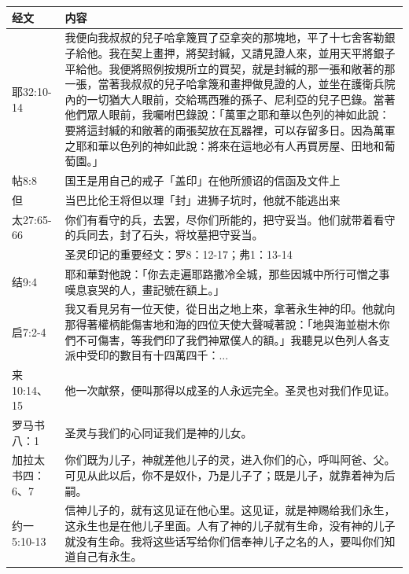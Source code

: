 \begin{table}[H]
\centering
\begin{tabular}{p{6em}|p{40em}}  \toprule
经文&内容\\  \midrule
耶32:10-14&我便向我叔叔的兒子哈拿篾買了亞拿突的那塊地，平了十七舍客勒銀子給他。我在契上畫押，將契封緘，又請見證人來，並用天平將銀子平給他。我便將照例按規所立的買契，就是封緘的那一張和敞著的那一張，當著我叔叔的兒子哈拿篾和畫押做見證的人，並坐在護衛兵院內的一切猶大人眼前，交給瑪西雅的孫子、尼利亞的兒子巴錄。當著他們眾人眼前，我囑咐巴錄說：「萬軍之耶和華以色列的神如此說：要將這封緘的和敞著的兩張契放在瓦器裡，可以存留多日。因為萬軍之耶和華以色列的神如此說：將來在這地必有人再買房屋、田地和葡萄園。」\\  \midrule


帖8:8&国王是用自己的戒子「盖印」在他所颁诏的信函及文件上\\  \midrule 
但&当巴比伦王将但以理「封」进狮子坑时，他就不能逃出来\\  \midrule 
太27:65-66&你们有看守的兵，去罢，尽你们所能的，把守妥当。他们就带着看守的兵同去，封了石头，将坟墓把守妥当。\\  \midrule 


&圣灵印记的重要经文：罗8：12-17；弗1：13-14\\  \midrule 

结9:4&耶和華對他說：「你去走遍耶路撒冷全城，那些因城中所行可憎之事嘆息哀哭的人，畫記號在額上。」\\  \midrule 
启7:2-4&我又看見另有一位天使，從日出之地上來，拿著永生神的印。他就向那得著權柄能傷害地和海的四位天使大聲喊著說：「地與海並樹木你們不可傷害，等我們印了我們神眾僕人的額。」我聽見以色列人各支派中受印的數目有十四萬四千：...\\  \midrule 

来10:14、15&他一次献祭，便叫那得以成圣的人永远完全。圣灵也对我们作见证。\\  \midrule 
罗马书八：1&圣灵与我们的心同证我们是神的儿女。\\  \midrule 
加拉太书四：6、7&你们既为儿子，神就差他儿子的灵，进入你们的心，呼叫阿爸、父。可见从此以后，你不是奴仆，乃是儿子了；既是儿子，就靠着神为后嗣。\\  \midrule 
约一5:10-13&信神儿子的，就有这见证在他心里。这见证，就是神赐给我们永生，这永生也是在他儿子里面。人有了神的儿子就有生命，没有神的儿子就没有生命。我将这些话写给你们信奉神儿子之名的人，要叫你们知道自己有永生。\\  \midrule 



\end{tabular}
\end{table}
